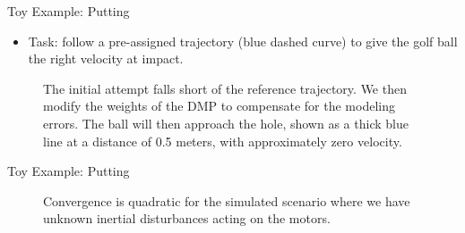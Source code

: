 \documentclass[handout]{beamer}
\begin{document}
\begin{frame}{Toy Example: Putting}
\begin{itemize}
\item Task: follow a pre-assigned trajectory (blue dashed curve) to give the golf ball the right velocity at impact.
\end{itemize}
\begin{figure}[ht]
\centering
{}
\caption{The initial attempt falls short of the reference trajectory. We then modify the weights of the DMP to compensate for the modeling errors. The ball will then approach the hole, shown as a thick blue line at a distance of 0.5 meters, with approximately zero velocity.} 
\label{putting1} 
\end{figure}
\end{frame}
%
\begin{frame}{Toy Example: Putting}
\begin{figure}
\centering
\newlength\figureheight 
\newlength\figurewidth 
\setlength\figureheight{6cm}  
\setlength\figurewidth{6cm} 
\scalebox{0.8}{}
\caption{Convergence is quadratic for the simulated scenario where we have unknown inertial disturbances acting on the motors.}
\label{wILCTrajectoryPutting}
\end{figure}
\end{frame}
%
\end{document}
